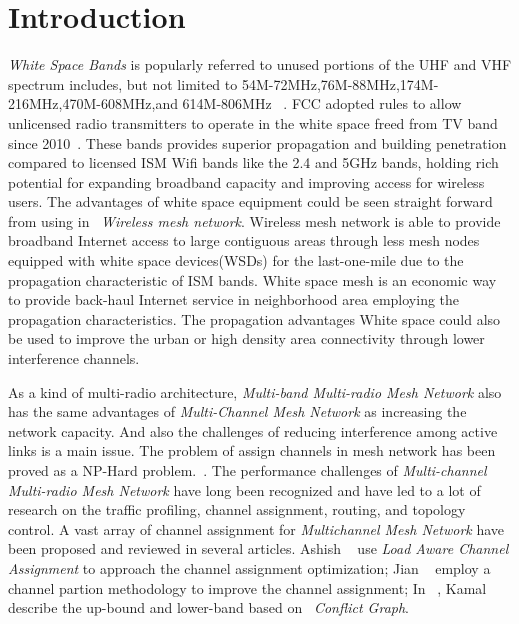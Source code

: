\section{Introduction}
\label{sec:introduction}

\emph{White Space Bands} is popularly referred to unused portions of the UHF and VHF spectrum includes, but not limited to 54M-72MHz,76M-88MHz,174M-216MHz,470M-608MHz,and 614M-806MHz ~\cite{whitespacewiki}.
FCC adopted rules to allow unlicensed radio transmitters to operate in the white space freed from TV band since 2010~\cite{fccwhitespace}. 
 These bands provides superior propagation and building penetration compared to licensed ISM Wifi bands like the 2.4 and 5GHz bands, holding rich potential for expanding broadband capacity and improving access for wireless users.
The advantages of white space equipment could be seen straight forward from using in ~\emph{Wireless mesh network}.
Wireless mesh network is able to provide broadband Internet access to large contiguous areas through less mesh nodes equipped with white space devices(WSDs) for the last-one-mile due to the propagation characteristic of ISM bands. 
White space mesh is an economic way to provide back-haul Internet service in neighborhood area employing the propagation characteristics.
The propagation advantages White space could also be used to improve the urban or high density area connectivity through lower interference channels. 

As a kind of multi-radio architecture, \emph{Multi-band Multi-radio Mesh Network} also has the same advantages of \emph{Multi-Channel Mesh Network} as increasing the network capacity. And also the challenges of reducing interference among active links is a main issue. 
The problem of assign channels in mesh network has been proved as a NP-Hard problem.~\cite{jain2005impact}. 
The performance challenges of \emph{Multi-channel Multi-radio Mesh Network} have long been recognized and have led to a lot of research on the traffic profiling, channel assignment, routing, and topology control. A vast array of channel assignment for \emph{Multichannel Mesh Network} have been proposed and reviewed in several articles.
Ashish ~\cite{raniwala2004centralized} use \emph{Load Aware Channel Assignment} to approach the channel assignment optimization; Jian ~\cite{tang2005interference} employ a channel partion methodology to improve the channel assignment; In ~\cite{jain2005impact}, Kamal describe the up-bound and lower-band based on ~\emph{Conflict Graph}.


